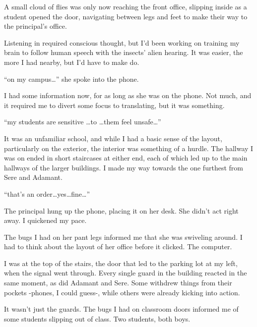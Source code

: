 A small cloud of flies was only now reaching the front office, slipping inside as a student opened the door, navigating between legs and feet to make their way to the principal's office.



Listening in required conscious thought, but I'd been working on training my brain to follow human speech with the insects' alien hearing.  It was easier, the more I had nearby, but I'd have to make do.



``\ldotsfight on my campus\ldots'' she spoke into the phone.



I had some information now, for as long as she was on the phone.  Not much, and it required me to divert some focus to translating, but it was something.



``\ldotsof my students are \ldotsly sensitive \ldots to \ldots them feel unsafe\ldots''



It was an unfamiliar school, and while I had a basic sense of the layout, particularly on the exterior, the interior was something of a hurdle.  The hallway I was on ended in short staircases at either end, each of which led up to the main hallways of the larger buildings.  I made my way towards the one furthest from Sere and Adamant.



``\ldotsif that's an order\ldots yes\ldots fine\ldots''



The principal hung up the phone, placing it on her desk.  She didn't act right away.  I quickened my pace.



The bugs I had on her pant legs informed me that she was swiveling around.  I had to think about the layout of her office before it clicked.  The computer.



I was at the top of the stairs, the door that led to the parking lot at my left, when the signal went through.  Every single guard in the building reacted in the same moment, as did Adamant and Sere.  Some withdrew things from their pockets -phones, I could guess-, while others were already kicking into action.



It wasn't just the guards.  The bugs I had on classroom doors informed me of some students slipping out of class.  Two students, both boys.



